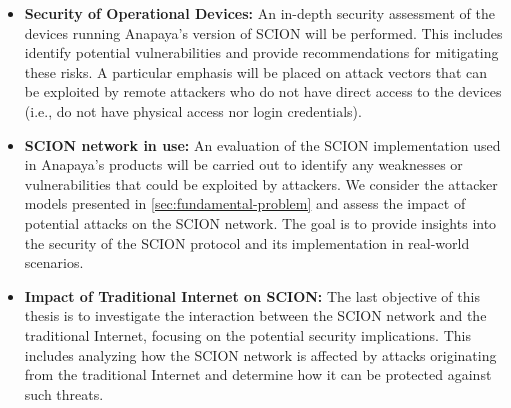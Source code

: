 \begin{itemize}
        \item \textbf{Security of Operational Devices:}
        An in-depth security assessment of the devices running Anapaya's version of SCION will be performed.
        This includes identify potential vulnerabilities and provide recommendations for mitigating these risks.
        A particular emphasis will be placed on attack vectors that can be exploited by remote attackers who do not have direct access to the devices (i.e., do not have physical access nor login credentials).

        \item \textbf{SCION network in use:}
        An evaluation of the SCION implementation used in Anapaya's products will be carried out to identify any weaknesses or vulnerabilities that could be exploited by attackers.
        We consider the attacker models presented in \cref{sec:fundamental-problem} and assess the impact of potential attacks on the SCION network.
        The goal is to provide insights into the security of the SCION protocol and its implementation in real-world scenarios.

        \item \textbf{Impact of Traditional Internet on SCION:}
        The last objective of this thesis is to investigate the interaction between the SCION network and the traditional Internet, focusing on the potential security implications.
        This includes analyzing how the SCION network is affected by attacks originating from the traditional Internet and determine how it can be protected against such threats.
\end{itemize}




